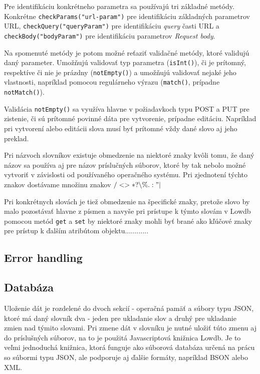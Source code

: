 \documentclass[
  digital, %
  table,   %
  lof,     %
  lot,     %
]{fithesis3}
\begin{document}
Pre identifikáciu konkrétneho parametra sa používajú tri základné metódy. Konkrétne \texttt{checkParams("url-param")} pre identifikáciu základných parametrov URL, \texttt{checkQuery("queryParam")} pre identifikáciu \textit{query} časti URL a \texttt{checkBody("bodyParam")} pre identifikáciu parametrov \textit{Request body}.

Na spomenuté metódy je potom možné reťaziť validačné metódy, ktoré validujú daný parameter. Umožňujú validovať typ parametra (\texttt{isInt()}), či je prítomný, respektíve či nie je prázdny (\texttt{notEmpty()}) a umožňujú validovať nejaké jeho vlastnosti, napríklad pomocou regulárneho výrazu (\texttt{match()}, prípadne \texttt{notMatch()}).

Validácia \texttt{notEmpty()} sa využíva hlavne v požiadavkoch typu POST a PUT pre zistenie, či sú prítomné povinné dáta pre vytvorenie, prípadne editáciu. Napríklad pri vytvorení alebo editácii slova musí byť prítomné vždy dané slovo aj jeho preklad. 

Pri názvoch slovníkov existuje obmedzenie na niektoré znaky kvôli tomu, že daný názov sa používa aj pre názov príslučných súborov, ktoré by tak nebolo možné vytvoriť v závislosti od používaného operačného systému. Pri zjednotení týchto znakov dostávame množinu znakov $\slash  <  >  *  ?  \backslash  \%  .  :  "  |$

Pri konkrétnych slovách je tiež obmedzenie na špecifické znaky, pretože slovo by malo pozostávať hlavne z písmen a navyše pri prístupe k týmto slovám v Lowdb pomocou metód \texttt{get} a \texttt{set} by niektoré znaky mohli byť brané ako kľúčové znaky pre prístup k ďalším atribútom objektu............

\subsection{Error handling}

\subsection{Databáza}
Uloženie dát je rozdelené do dvoch sekcií - operačná pamäť a súbory typu JSON, ktoré má daný slovník dva - jeden pre ukladanie slov a druhý pre ukladanie zmien nad týmito slovami. Pri zmene dát v slovníku je nutné uložiť túto zmenu aj do príslušných súborov, na to je použitá Javascriptová knižnica Lowdb. Je to veľmi jednoduchá knižnica, ktorá funguje ako súborová databáza určená na prácu so súbormi typu JSON, ale podporuje aj ďalšie formáty, napríklad BSON alebo XML.
\end{document}

